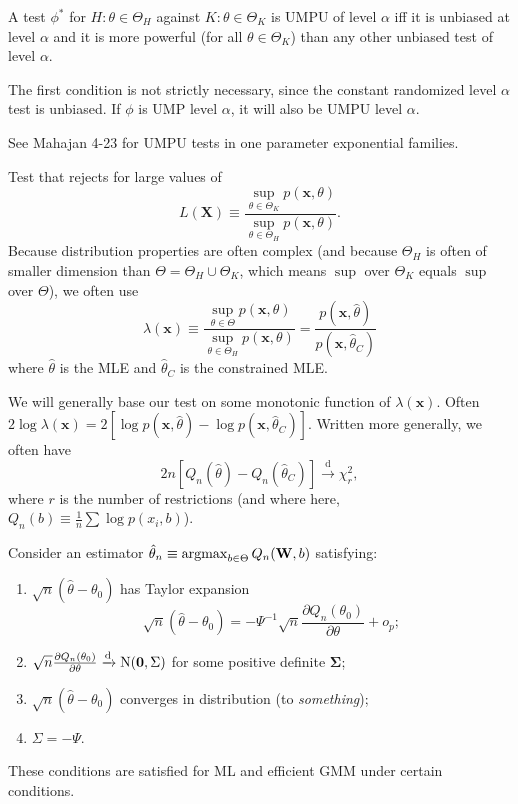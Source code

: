 \documentclass[8pt,letterpaper, landscape]{extarticle} %
\newcommand{\mX}{\ensuremath{\mathbf{X}}}
\newcommand{\mx}{\ensuremath{\mathbf{x}}}
\newcommand{\mSigma}{\ensuremath{\mathbf{\Sigma}}}
\newcommand{\mzero}{\ensuremath{\mathbf{0}}}
\renewcommand{\ln}{\log}
\begin{document}
\begin{multicols}{3}
\begin{description}
 A test $ \phi^* $ for $ H \colon \theta \in \Theta_H $ against $ K \colon \theta \in \Theta_K $ is UMPU of level $ \alpha $ iff it is unbiased at level $ \alpha $ and it is more powerful (for all $ \theta \in \Theta_K $) than any other unbiased test of level $ \alpha $.

The first condition is not strictly necessary, since the constant randomized level $ \alpha $ test is unbiased. If $ \phi $ is UMP level $ \alpha $, it will also be UMPU level $ \alpha $.

See Mahajan 4-23 for UMPU tests in one parameter exponential families.

 Test that rejects for large values of
$$ L(\mX) \equiv \frac{\sup_{\theta \in \Theta_K} p(\mx, \theta)}{\sup_{\theta \in \Theta_H} p(\mx, \theta)}. $$
Because distribution properties are often complex (and because $ \Theta_H $ is often of smaller dimension than $ \Theta = \Theta_H \cup \Theta_K $, which means $ \sup $ over $ \Theta_K $ equals $ \sup $ over $ \Theta $), we often use
$$ \lambda (\mx) \equiv \frac{\sup_{\theta \in \Theta} p(\mx, \theta)}{\sup_{\theta \in \Theta_H} p(\mx, \theta)} = \frac{p(\mx, \hat{\theta})}{p(\mx, \hat{\theta}_C)} $$
where $ \hat{\theta} $ is the MLE and $ \hat{\theta}_C $ is the constrained MLE.

We will generally base our test on some monotonic function of $ \lambda(\mx) $. Often $ 2 \log \lambda(\mx) = 2 [ \log p(\mx, \hat{\theta}) - \log p(\mx, \hat{\theta}_C) ] $. Written more generally, we often have
\[ 2 n [ Q_n (\hat{\theta}) - Q_n (\hat{\theta}_C) ] \xrightarrow{\text{d}} \chi^{2}_{r} , \]
where $ r $ is the number of restrictions (and where here, $ Q_n (b) \equiv \tfrac{1}{n} \sum \ln p(x_i, b) $).

 Consider an estimator $ \hat{\theta}_n \equiv \operatorname*{argmax}_{b \in \Theta} Q_n (\mathbf{W} , b) $ satisfying:
\begin{enumerate}
\item $ \sqrt{n} (\hat{\theta} - \theta_0) $ has Taylor expansion
\[ \sqrt{n} (\hat{\theta} - \theta_0) = - \Psi^{-1} \sqrt{n} \frac{\partial Q_n (\theta_0)}{\partial \theta} + o_p ; \]
\item $ \sqrt{n} \tfrac{\partial Q_n (\theta_0)}{\partial \theta} \xrightarrow{\text{d}} \n (\mzero , \Sigma ) $ for some positive definite $ \mSigma $;
\item $ \sqrt{n} (\hat{\theta} - \theta_0) $ converges in distribution (to \textit{something});
\item $ \Sigma = - \Psi $.
\end{enumerate}
These conditions are satisfied for ML and efficient GMM under certain conditions.


\end{description}
\end{multicols}
\end{document}
